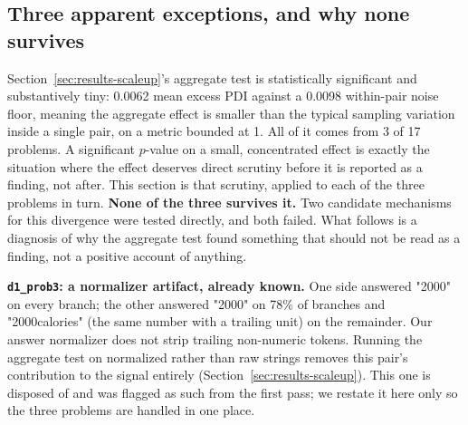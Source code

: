 \documentclass{article}
\begin{document}
\subsection{Three apparent exceptions, and why none survives}
\label{sec:results-mechanisms}

Section~\ref{sec:results-scaleup}'s aggregate test is statistically significant and substantively tiny: 0.0062 mean excess PDI against a 0.0098 within-pair noise floor, meaning the aggregate effect is smaller than the typical sampling variation inside a single pair, on a metric bounded at 1. All of it comes from 3 of 17 problems. A significant $p$-value on a small, concentrated effect is exactly the situation where the effect deserves direct scrutiny before it is reported as a finding, not after. This section is that scrutiny, applied to each of the three problems in turn. \textbf{None of the three survives it.} Two candidate mechanisms for this divergence were tested directly, and both failed. What follows is a diagnosis of why the aggregate test found something that should not be read as a finding, not a positive account of anything.

\textbf{\texttt{d1\_prob3}: a normalizer artifact, already known.} One side answered "2000" on every branch; the other answered "2000" on 78\% of branches and "2000calories" (the same number with a trailing unit) on the remainder. Our answer normalizer does not strip trailing non-numeric tokens. Running the aggregate test on normalized rather than raw strings removes this pair's contribution to the signal entirely (Section~\ref{sec:results-scaleup}). This one is disposed of and was flagged as such from the first pass; we restate it here only so the three problems are handled in one place.
\end{document}
